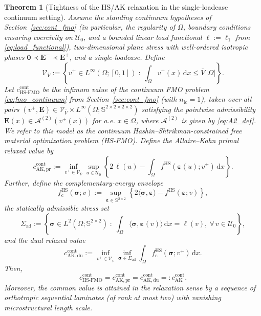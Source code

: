 \documentclass[preprint,3p]{elsarticle}
\newcommand{\tens}[1]{\bm{\mathit{#1}}}             %
\newcommand{\tenss}[1]{\bm{\mathbf{#1}}}            %
\newcommand{\tensf}[1]{\bm{\mathbf{#1}}}            %
\newcommand{\strain}{\tenss{\varepsilon}}           %
\newcommand{\stress}{\tenss{\sigma}}                %
\newcommand{\Emin}{\tensf{E}^{-}}                   %
\newcommand{\Emax}{\tensf{E}^{+}}                   %
\newcommand{\nlc}{n_\mathrm{lc}}                    %
\newtheorem{theorem}{Theorem}[section]
\begin{document}
\begin{theorem}[Tightness of the HS/AK relaxation in the single-loadcase continuum setting]\label{th:tight}
Assume the standing continuum hypotheses of Section~\ref{sec:cont_fmo} (in particular, the regularity of $\Omega$, boundary conditions ensuring coercivity on $\mathcal U_0$, and a bounded linear load functional $\ell:=\ell_1$ from \eqref{eq:load_functional}), two-dimensional plane stress with well-ordered isotropic phases $\tensf{0}\prec\Emin\prec\Emax$, and a single-loadcase.
Define
%
\begin{equation}
\mathcal V_{\overline{V}}
:=
\left\{
v^+\in L^\infty(\Omega;[0,1])\;:\;
\int_\Omega v^+(\tens{x})\,\mathrm d\tens{x}\le \overline{V}\,\lvert\Omega\rvert
\right\}.
\end{equation}
%
Let $c_{\mathrm{HS\text{-}FMO}}^{\mathrm{cont}}$ be the infimum value of the continuum FMO problem \eqref{eq:fmo_continuum} from Section~\ref{sec:cont_fmo} (with $\nlc=1$), taken over all pairs $(v^+,\tensf E)\in \mathcal V_{\overline{V}}\times L^\infty(\Omega;\mathbb{S}^{2\times2\times2\times2})$ satisfying the pointwise admissibility $\tensf E(\tens{x})\in \mathcal A^{(2)}(v^+(\tens{x}))$ for a.e. $\tens{x}\in\Omega$, where $\mathcal A^{(2)}$ is given by \eqref{eq:A2_def}. We refer to this model as the continuum Hashin--Shtrikman-constrained free material optimization problem (HS-FMO). Define the Allaire--Kohn primal relaxed value by
%
\begin{equation}\label{eq:ak_primal_cont}
c_{\mathrm{AK,pr}}^{\mathrm{cont}}
:=
\inf_{v^+\in\mathcal V_{\overline{V}}}
\sup_{\tens{u}\in\mathcal U_0}
\left\{
2\,\ell(\tens{u})
-\int_\Omega f^{\mathrm{HS}}(\strain(\tens{u});v^+)\,\mathrm d\tens{x}
\right\}.
\end{equation}
%
Further, define the complementary-energy envelope
%
\begin{equation}\label{eq:gak_def}
f_{\mathrm{c}}^{\mathrm{HS}}(\stress;v)
:=
\sup_{\strain\in\mathbb{S}^{2\times2}}
\left\{
2\langle\stress,\strain\rangle-f^{\mathrm{HS}}(\strain;v)
\right\},
\end{equation}
%
the statically admissible stress set
%
\begin{equation}
\Sigma_{\mathrm{ad}}
:=
\left\{
\stress\in L^2(\Omega;\mathbb{S}^{2\times2})\;:\;
\int_\Omega \langle\stress,\strain(\tens{v})\rangle\,\mathrm d\tens{x}=\ell(\tens{v}),
\ \forall\,\tens{v}\in\mathcal U_0
\right\},
\end{equation}
%
and the dual relaxed value
%
\begin{equation}\label{eq:ak_dual_cont}
c_{\mathrm{AK,du}}^{\mathrm{cont}}
:=
\inf_{v^+\in\mathcal V_{\overline{V}}}
\inf_{\stress\in\Sigma_{\mathrm{ad}}}
\int_\Omega f_{\mathrm{c}}^{\mathrm{HS}}(\stress;v^+)\,\mathrm d\tens{x}.
\end{equation}
%
Then,
%
\begin{equation}
c_{\mathrm{HS\text{-}FMO}}^{\mathrm{cont}}
=
c_{\mathrm{AK,pr}}^{\mathrm{cont}}
=
c_{\mathrm{AK,du}}^{\mathrm{cont}}
=:
c_{\mathrm{AK}}^{\mathrm{cont}}.
\end{equation}
%
Moreover, the common value is attained in the relaxation sense by a sequence of orthotropic sequential laminates (of rank at most two) with vanishing microstructural length scale.
\end{theorem}
\end{document}

